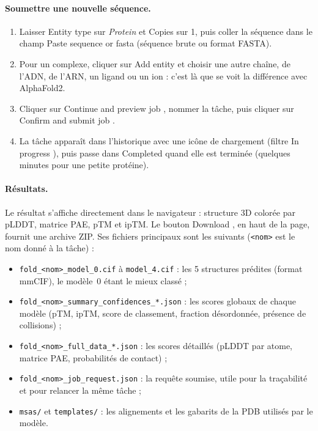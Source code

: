 \paragraph{Soumettre une nouvelle séquence.}
\begin{enumerate}
  \item Laisser \og Entity type \fg{} sur \emph{Protein} et \og Copies \fg{} sur 1, puis coller la séquence dans le champ \og Paste sequence or fasta \fg{} (séquence brute ou format FASTA).
  \item Pour un complexe, cliquer sur \og Add entity \fg{} et choisir une autre chaîne, de l'ADN, de l'ARN, un ligand ou un ion : c'est là que se voit la différence avec AlphaFold2.
  \item Cliquer sur \og Continue and preview job \fg{}, nommer la tâche, puis cliquer sur \og Confirm and submit job \fg{}.
  \item La tâche apparaît dans l'historique avec une icône de chargement (filtre \og In progress \fg{}), puis passe dans \og Completed \fg{} quand elle est terminée (quelques minutes pour une petite protéine).
\end{enumerate}

\paragraph{Résultats.} Le résultat s'affiche directement dans le navigateur : structure 3D colorée par pLDDT, matrice PAE, pTM et ipTM. Le bouton \og Download \fg{}, en haut de la page, fournit une archive ZIP. Ses fichiers principaux sont les suivants (\texttt{<nom>} est le nom donné à la tâche) :
\begin{itemize}
  \item \texttt{fold\_<nom>\_model\_0.cif} à \texttt{model\_4.cif} : les 5 structures prédites (format mmCIF), le modèle~0 étant le mieux classé ;
  \item \texttt{fold\_<nom>\_summary\_confidences\_*.json} : les scores globaux de chaque modèle (pTM, ipTM, score de classement, fraction désordonnée, présence de collisions) ;
  \item \texttt{fold\_<nom>\_full\_data\_*.json} : les scores détaillés (pLDDT par atome, matrice PAE, probabilités de contact) ;
  \item \texttt{fold\_<nom>\_job\_request.json} : la requête soumise, utile pour la traçabilité et pour relancer la même tâche ;
  \item \texttt{msas/} et \texttt{templates/} : les alignements et les gabarits de la PDB utilisés par le modèle.
\end{itemize}

